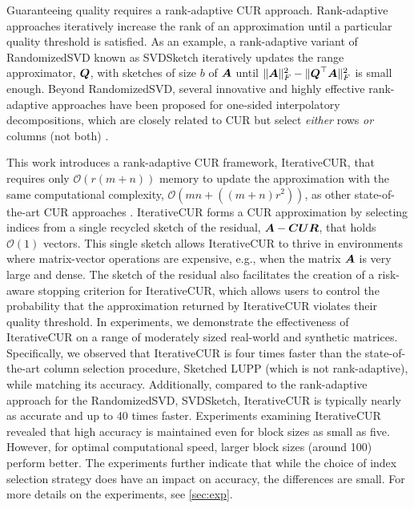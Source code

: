 Guaranteeing quality requires a rank-adaptive CUR approach. Rank-adaptive approaches iteratively increase the rank of an approximation until a particular quality threshold is satisfied. As an example, a rank-adaptive variant of RandomizedSVD \cite{halko2011finding} known as SVDSketch \cite{yu2018efficient} iteratively updates the range approximator, $\boldsymbol{Q}$, with sketches of size $b$ of $\boldsymbol{A}$ until $\|\boldsymbol{A}\|_F^2 - \|\boldsymbol{Q}^\top\boldsymbol{A}\|_F^2$ is small enough. Beyond RandomizedSVD, several innovative and highly effective rank-adaptive approaches have been proposed for one-sided interpolatory decompositions, which are closely related to CUR but select \textit{either} rows \textit{or} columns (not both) \cite{dong2024robust, pearce2025adaptive}.


This work introduces a rank-adaptive CUR framework, IterativeCUR, that requires only $\mathcal{O}(r(m+n))$ memory to update the approximation with the same computational complexity, $\mathcal{O}(mn+((m+n)r^2))$, as other state-of-the-art CUR approaches \cite{dong2023simpler}. IterativeCUR forms a CUR approximation by selecting indices from a single recycled sketch of the residual, $\boldsymbol{A} - \boldsymbol{C} \boldsymbol{U}\boldsymbol{R}$, that holds $\mathcal{O}(1)$ vectors. This single sketch allows IterativeCUR to thrive in environments where matrix-vector operations are expensive, e.g., when the matrix $\boldsymbol{A}$ is very large and dense. The sketch of the residual also facilitates the creation of a risk-aware stopping criterion for IterativeCUR, which allows users to control the probability that the approximation returned by IterativeCUR violates their quality threshold. 
 In experiments, we demonstrate the effectiveness of IterativeCUR on a range of moderately sized real-world and synthetic matrices.  Specifically, we observed that IterativeCUR is four times faster than the state-of-the-art column selection procedure, Sketched LUPP \cite{dong2023simpler} (which is not rank-adaptive), while matching its accuracy. Additionally, compared to the rank-adaptive approach for the RandomizedSVD, SVDSketch, IterativeCUR is typically nearly as accurate and up to 40 times faster.  Experiments examining IterativeCUR revealed that high accuracy is maintained even for block sizes as small as five. However, for optimal computational speed, larger block sizes (around 100) perform better. The experiments further indicate that while the choice of index selection strategy does have an impact on accuracy, the differences are small. For more details on the experiments, see \cref{sec:exp}. 

